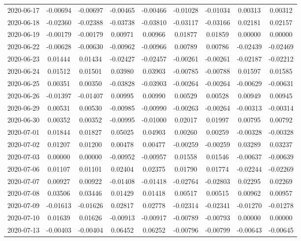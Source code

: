 {\begin{footnotesize}
\begin{longtable}{lcccccccc}
2020-06-17 & -0.00694 & -0.00697 & -0.00465 & -0.00466 & -0.01028 & -0.01034 & 0.00313 & 0.00312 \\
2020-06-18 & -0.02360 & -0.02388 & -0.03738 & -0.03810 & -0.03117 & -0.03166 & 0.02181 & 0.02157 \\
2020-06-19 & -0.00179 & -0.00179 & 0.00971 & 0.00966 & 0.01877 & 0.01859 & 0.00000 & 0.00000 \\
2020-06-22 & -0.00628 & -0.00630 & -0.00962 & -0.00966 & 0.00789 & 0.00786 & -0.02439 & -0.02469 \\
2020-06-23 & 0.01444 & 0.01434 & -0.02427 & -0.02457 & -0.00261 & -0.00261 & -0.02187 & -0.02212 \\
2020-06-24 & 0.01512 & 0.01501 & 0.03980 & 0.03903 & -0.00785 & -0.00788 & 0.01597 & 0.01585 \\
2020-06-25 & 0.00351 & 0.00350 & -0.03828 & -0.03903 & -0.00264 & -0.00264 & -0.00629 & -0.00631 \\
2020-06-26 & -0.01397 & -0.01407 & 0.00995 & 0.00990 & 0.00529 & 0.00528 & 0.00949 & 0.00945 \\
2020-06-29 & 0.00531 & 0.00530 & -0.00985 & -0.00990 & -0.00263 & -0.00264 & -0.00313 & -0.00314 \\
2020-06-30 & 0.00352 & 0.00352 & -0.00995 & -0.01000 & 0.02017 & 0.01997 & 0.00795 & 0.00792 \\
2020-07-01 & 0.01844 & 0.01827 & 0.05025 & 0.04903 & 0.00260 & 0.00259 & -0.00328 & -0.00328 \\
2020-07-02 & 0.01207 & 0.01200 & 0.00478 & 0.00477 & -0.00259 & -0.00259 & 0.03289 & 0.03237 \\
2020-07-03 & 0.00000 & 0.00000 & -0.00952 & -0.00957 & 0.01558 & 0.01546 & -0.00637 & -0.00639 \\
2020-07-06 & 0.01107 & 0.01101 & 0.02404 & 0.02375 & 0.01790 & 0.01774 & -0.02244 & -0.02269 \\
2020-07-07 & 0.00927 & 0.00922 & -0.01408 & -0.01418 & -0.02764 & -0.02803 & 0.02295 & 0.02269 \\
2020-07-08 & 0.03506 & 0.03446 & 0.01429 & 0.01418 & 0.00517 & 0.00515 & 0.00962 & 0.00957 \\
2020-07-09 & -0.01613 & -0.01626 & 0.02817 & 0.02778 & -0.02314 & -0.02341 & -0.01270 & -0.01278 \\
2020-07-10 & 0.01639 & 0.01626 & -0.00913 & -0.00917 & -0.00789 & -0.00793 & 0.00000 & 0.00000 \\
2020-07-13 & -0.00403 & -0.00404 & 0.06452 & 0.06252 & -0.00796 & -0.00799 & -0.00643 & -0.00645 \\

\end{longtable}
\end{footnotesize}}
